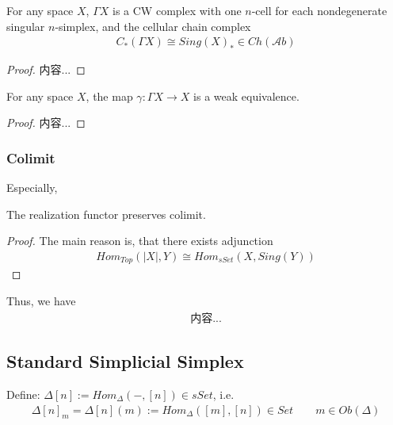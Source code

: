 \documentclass[Total.tex]{subfiles}
\begin{document}
				\begin{theorem}
					For any space $X$, $\Gamma X$ is a CW complex with one $n$-cell for each nondegenerate singular $n$-simplex, and the cellular chain complex
					\begin{gather*}
						C_*(\Gamma X)\cong Sing(X)_* \in Ch({\mathcal Ab})
					\end{gather*}
				\end{theorem}
				\begin{proof}
					内容...
				\end{proof}
				
				\begin{theorem}
					For any space $X$, the map $\gamma:\Gamma X\rightarrow X$ is a weak equivalence.
				\end{theorem}
				\begin{proof}
					内容...
				\end{proof}
				
				\subsubsection{Colimit}
				
				Especially, 
				
				\begin{proposition}
					The realization functor preserves colimit.
				\end{proposition}
				\begin{proof}
					The main reason is, that there exists adjunction
					\begin{gather*}
						Hom_{Top}(|X|,Y)\cong Hom_{sSet}(X,Sing(Y))
					\end{gather*}
				\end{proof}
				
				Thus, we have
				\begin{gather*}
					内容...
				\end{gather*}
			\subsection{Standard Simplicial Simplex}
				\begin{Def}
					Define: $\Delta[n]:=Hom_\Delta(-,[n])\in sSet$, i.e. 
					\begin{gather*}
						\Delta[n]_m=\Delta[n](m):=Hom_\Delta([m],[n])\in Set\qquad m\in Ob(\Delta )
					\end{gather*}
				\end{Def}
				
\end{document}
